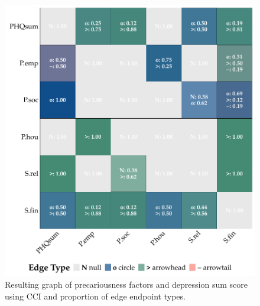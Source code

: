 \documentclass[
]{article}
\begin{document}
\begin{figure}
\begin{minipage}{0.50\linewidth}
{\includegraphics[width=1\textwidth,height=\textheight]{img/depsum_mat_cci.pdf}

}


\end{minipage}%

\caption{\label{fig-sum-cci}Resulting graph of precariousness factors
and depression sum score using CCI and proportion of edge endpoint
types.}

\end{figure}%
\end{document}
